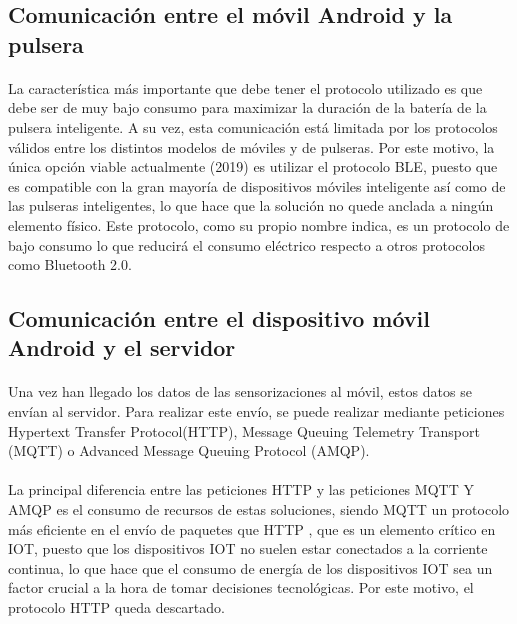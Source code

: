 \subsection{Comunicación entre el móvil Android y la pulsera}
\paragraph{}
La característica más importante que debe tener el protocolo utilizado es que debe ser de muy bajo consumo para maximizar la duración de la batería de la pulsera inteligente. A su vez, esta comunicación está limitada por los protocolos válidos entre los distintos modelos de móviles y de pulseras. Por este motivo, la única opción viable actualmente (2019) es utilizar el protocolo BLE, puesto que es compatible con la gran mayoría de dispositivos móviles inteligente así como de las pulseras inteligentes, lo que hace que la solución no quede anclada a ningún elemento físico. Este protocolo, como su propio nombre indica, es un protocolo de bajo consumo lo que reducirá el consumo eléctrico respecto a otros protocolos como Bluetooth 2.0.

\subsection{Comunicación entre el dispositivo móvil Android y el servidor}
\paragraph{}
Una vez han llegado los datos de las sensorizaciones al móvil, estos datos se envían al servidor. Para realizar este envío, se puede realizar mediante peticiones Hypertext Transfer Protocol(HTTP), Message Queuing Telemetry Transport (MQTT) o Advanced Message Queuing Protocol (AMQP).

\paragraph{}
La principal diferencia entre las peticiones HTTP y las peticiones MQTT Y AMQP es el consumo de recursos de estas soluciones, siendo MQTT un protocolo más eficiente en el envío de paquetes que HTTP \citep{yokotani2016comparison}, que es un elemento crítico en IOT, puesto que los dispositivos IOT no suelen estar conectados a la corriente continua, lo que hace que el consumo de energía de los dispositivos IOT sea un factor crucial a la hora de tomar decisiones tecnológicas. Por este motivo, el protocolo HTTP queda descartado.

